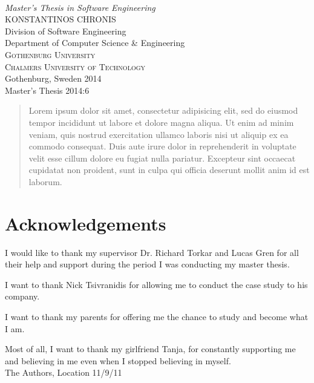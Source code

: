 \begin{titlepage}

\mbox{}
\vfill
\addtolength{\voffset}{2cm}
\begin{flushleft}
	{ \\[0.5cm]
	\emph{\Large Master's Thesis in Software Engineering} \\[.8cm]
	
	{\huge KONSTANTINOS CHRONIS}\\[.8cm]
	
	{\Large Division of Software Engineering \\
	Department of Computer Science \& Engineering \\
	\textsc{Gothenburg University} \\
	\textsc{Chalmers University of Technology} \\
	Gothenburg, Sweden 2014 \\
	Master's Thesis 2014:6\\
	} 
	}
\end{flushleft}

\end{titlepage}
\ClearShipoutPicture

\pagestyle{empty}
\newpage
\clearpage
\mbox{}
\newpage
\clearpage
\thispagestyle{empty}

\begin{abstract}
Lorem ipsum dolor sit amet, consectetur adipisicing elit, sed do eiusmod tempor incididunt ut labore et dolore magna aliqua. Ut enim ad minim veniam, quis nostrud exercitation ullamco laboris nisi ut aliquip ex ea commodo consequat. Duis aute irure dolor in reprehenderit in voluptate velit esse cillum dolore eu fugiat nulla pariatur. Excepteur sint occaecat cupidatat non proident, sunt in culpa qui officia deserunt mollit anim id est laborum.
\end{abstract}

\newpage
\clearpage
\mbox{}
\newpage
\clearpage
\thispagestyle{empty}
\section*{Acknowledgements}
I would like to thank my supervisor Dr. Richard Torkar and Lucas Gren for all their help and support during the period I was conducting my master thesis.

I want to thank Nick Tsivranidis for allowing me to conduct the case study to his company.

I want to thank my parents for offering me the chance to study and become what I am.

Most of all, I want to thank my girlfriend Tanja, for constantly supporting me and believing in me even when I stopped believing in myself. \\[1cm]

\hfill The Authors, Location 11/9/11
\newpage
\clearpage
\mbox{}
